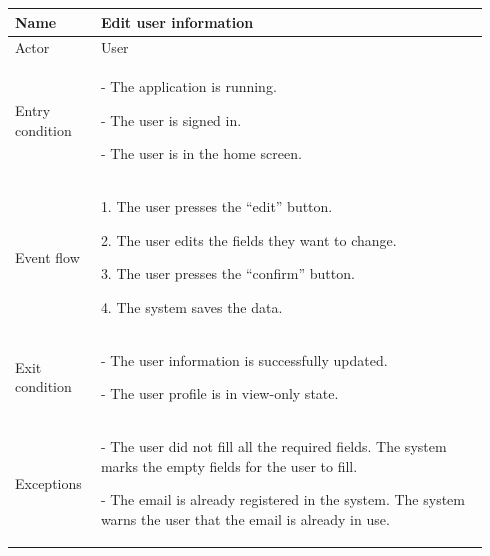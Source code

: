 \begin{table}[H]
\begin{tabular}{|p{0.17\linewidth}|p{0.77\linewidth}|}
\hline
Name            & Edit user information
\\ \hline

Actor           & User
\\ \hline

Entry condition &
- The application is running.

- The user is signed in.

- The user is in the home screen.
\\ \hline
Event flow      & 
    1. The user presses the “edit” button.

    2. The user edits the fields they want to change.

    3. The user presses the “confirm” button.
    
    4. The system saves the data.
\\ \hline
Exit condition  & 
    - The user information is successfully updated.

    - The user profile is in view-only state.
\\ \hline
Exceptions      &
    - The user did not fill all the required fields. The system marks the empty fields for the user to fill.

    - The email is already registered in the system. The system warns the user that the email is already in use.
\\ \hline
\end{tabular}
\end{table}

